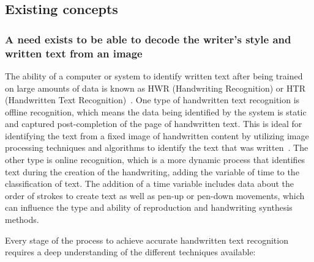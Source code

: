 \label{sec:literature}


\subsection{Existing concepts}
\label{sec:lit-background}

\subsubsection{A need exists to be able to decode the writer's style and written text from an image}
\label{sec:lit-hwr}

The ability of a computer or system to identify written text after being trained on large amounts of data is known as HWR (Handwriting Recognition) or HTR (Handwritten Text Recognition)~\cite{chen2023}.
One type of handwritten text recognition is offline recognition, which means the data being identified by the system is static and captured post-completion of the page of handwritten text. This is ideal for identifying the text from a fixed image of handwritten content by utilizing image processing techniques and algorithms to identify the text that was written~\cite{ma2023}. The other type is online recognition, which is a more dynamic process that identifies text during the creation of the handwriting, adding the variable of time to the classification of text. The addition of a time variable includes data about the order of strokes to create text as well as pen-up or pen-down movements, which can influence the type and ability of reproduction and handwriting synthesis methods.

Every stage of the process to achieve accurate handwritten text recognition requires a deep understanding of the different techniques available:

